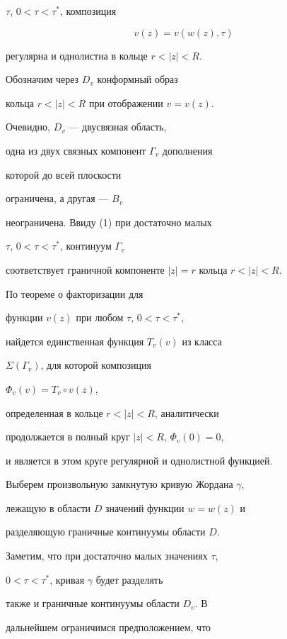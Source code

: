 $\tau$, $0<\tau<\tau^{*}$, композиция


$$


v(z)=v(w(z),\tau)


$$


регулярна и однолистна в кольце $r<|z|<R$.


Обозначим через $D_{v}$ конформный образ


кольца $r<|z|<R$ при отображении $v=v(z)$.


Очевидно, $D_{v}$ --- двусвязная область, 


одна из двух связных компонент $\Gamma_{v}$ дополнения


которой до всей плоскости 


ограничена, а другая --- $B_{v}$


неограничена. Ввиду (1) при достаточно малых 


$\tau$, $0<\tau<\tau^{*}$, континуум $\Gamma_{v}$


соответствует граничной компоненте $|z|=r$ кольца $r<|z|<R$.





По теореме о факторизации для


функции $v(z)$ при любом $\tau$, $0<\tau<\tau^{*}$,


найдется единственная функция $T_{v}(v)$ из класса


$\Sigma(\Gamma_{v})$, для которой композиция


$\Phi_{v}(v)=T_{v}\circ v(z)$,


определенная в кольце $r<|z|<R$, аналитически


продолжается в полный круг $|z|<R$, $\Phi_{v}(0)=0$,


и является в этом круге регулярной и однолистной функцией.





Выберем произвольную замкнутую кривую Жордана $\gamma$,


лежащую в области $D$ значений функции $w=w(z)$ и


разделяющую граничные континуумы области $D$.


Заметим, что при достаточно малых значениях $\tau$,


$0<\tau<\tau^{*}$, кривая $\gamma$ будет разделять


также и граничные континуумы области $D_{v}$. В 


дальнейшем ограничимся предположением, что 


